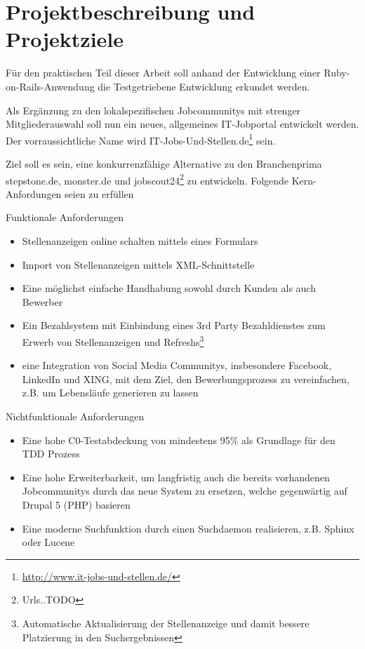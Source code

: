\section{Projektbeschreibung und Projektziele}
Für den praktischen Teil dieser Arbeit soll anhand der Entwicklung einer Ruby-on-Rails-Anwendung die Testgetriebene Entwicklung erkundet werden.

Als Ergänzung zu den lokalspezifischen Jobcommunitys mit strenger Mitgliederauswahl soll nun ein neues, allgemeines IT-Jobportal entwickelt werden. Der vorraussichtliche Name wird IT-Jobs-Und-Stellen.de\footnote{\url{http://www.it-jobs-und-stellen.de/}} sein.

Ziel soll es sein, eine konkurrenzfähige Alternative zu den Branchenprima stepstone.de, monster.de und jobscout24\footnote{Urls..TODO} zu entwickeln. Folgende Kern-Anfordungen seien zu erfüllen

Funktionale Anforderungen
\begin{itemize}
 \item Stellenanzeigen online schalten mittels eines Formulars
 \item Import von Stellenanzeigen mittels XML-Schnittstelle
 \item Eine möglichst einfache Handhabung sowohl durch Kunden als auch Bewerber
 \item Ein Bezahlsystem mit Einbindung eines 3rd Party Bezahldienstes zum Erwerb von Stellenanzeigen und Refreshs\footnote{Automatische Aktualisierung der Stellenanzeige und damit bessere Platzierung in den Suchergebnissen}
 \item eine Integration von Social Media Communitys, insbesondere Facebook, LinkedIn und XING, mit dem Ziel, den Bewerbungsprozess zu vereinfachen, z.B. um Lebensläufe generieren zu lassen
\end{itemize}

Nichtfunktionale Anforderungen
\begin{itemize}
 \item Eine hohe C0-Testabdeckung von mindestens 95\% als Grundlage für den TDD Prozess
 \item Eine hohe Erweiterbarkeit, um langfristig auch die bereits vorhandenen Jobcommunitys durch das neue System zu ersetzen, welche gegenwärtig auf Drupal 5 (PHP) basieren
 \item Eine moderne Suchfunktion durch einen Suchdaemon realisieren, z.B. Sphinx oder Lucene
\end{itemize}
